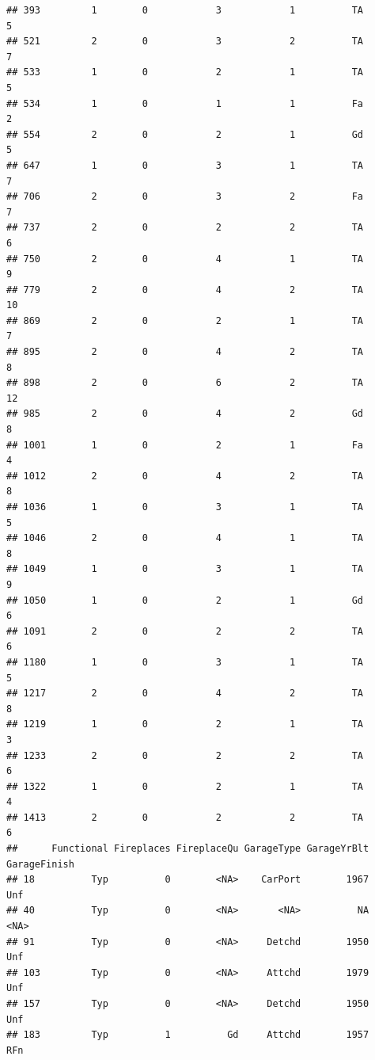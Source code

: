 \documentclass[]{article}
\begin{document}
\begin{verbatim}
## 393         1        0            3            1          TA            5
## 521         2        0            3            2          TA            7
## 533         1        0            2            1          TA            5
## 534         1        0            1            1          Fa            2
## 554         2        0            2            1          Gd            5
## 647         1        0            3            1          TA            7
## 706         2        0            3            2          Fa            7
## 737         2        0            2            2          TA            6
## 750         2        0            4            1          TA            9
## 779         2        0            4            2          TA           10
## 869         2        0            2            1          TA            7
## 895         2        0            4            2          TA            8
## 898         2        0            6            2          TA           12
## 985         2        0            4            2          Gd            8
## 1001        1        0            2            1          Fa            4
## 1012        2        0            4            2          TA            8
## 1036        1        0            3            1          TA            5
## 1046        2        0            4            1          TA            8
## 1049        1        0            3            1          TA            9
## 1050        1        0            2            1          Gd            6
## 1091        2        0            2            2          TA            6
## 1180        1        0            3            1          TA            5
## 1217        2        0            4            2          TA            8
## 1219        1        0            2            1          TA            3
## 1233        2        0            2            2          TA            6
## 1322        1        0            2            1          TA            4
## 1413        2        0            2            2          TA            6
##      Functional Fireplaces FireplaceQu GarageType GarageYrBlt GarageFinish
## 18          Typ          0        <NA>    CarPort        1967          Unf
## 40          Typ          0        <NA>       <NA>          NA         <NA>
## 91          Typ          0        <NA>     Detchd        1950          Unf
## 103         Typ          0        <NA>     Attchd        1979          Unf
## 157         Typ          0        <NA>     Detchd        1950          Unf
## 183         Typ          1          Gd     Attchd        1957          RFn

\end{verbatim}
\end{document}
